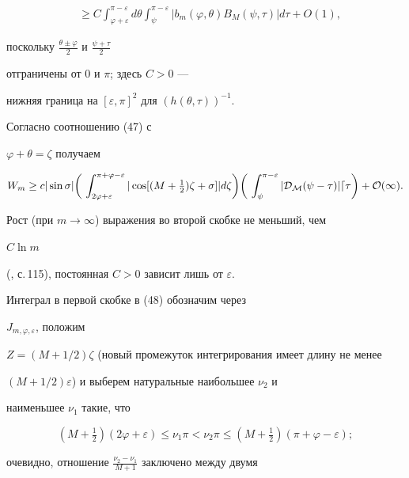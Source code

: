 \begin{pf}
\begin{align*}
%


&\ge C\int^{\pi-\varepsilon}_{\varphi+\varepsilon} 


d\theta\int^{\pi-\varepsilon}_\psi 


|b_m(\varphi,\theta)B_M(\psi,\tau)|d\tau+O(1), 


\end{align*} 


поскольку $\frac{\theta\pm\varphi}{2}$ и $\frac{\psi+\tau}{2}$ 


отграничены от $0$ и $\pi$; здесь $C>0$ --- 


нижняя граница на $[\varepsilon,\pi]^2$ для $(h(\theta,\tau))^{-1}$. 


Согласно соотношению (47) с 


$\varphi+\theta=\zeta$ получаем 


\begin{equation} 


W_m\ge c|\sin\sigma|\bigg(\, 


\int^{\pi+\varphi-\varepsilon}_{2\varphi+\varepsilon} 


|\cos[(M+\tfrac{1}{2})\zeta+\sigma]|d\zeta\bigg) 


\bigg(\,\int^{\pi-\varepsilon}_\psi


|\cal D_M(\psi-\tau)|d\tau\bigg)+O(1). 


\end{equation} 


Рост (при $m\to\infty$) выражения во второй скобке не меньший, чем 


$C\ln m$ 


(\cite{2}, с.\,115), постоянная $C>0$ зависит лишь от $\varepsilon$. 


Интеграл в первой скобке в (48) обозначим через 


$J_{m,\varphi,\varepsilon}$, положим 


$Z=(M+1/2)\zeta$ (новый промежуток интегрирования имеет длину не менее 


$(M+1/2)\varepsilon$) и выберем натуральные наибольшее $\nu_2$ и 


наименьшее $\nu_1$ такие, что 


$$ 


(M+\tfrac{1}{2})(2\varphi+\varepsilon)\le\nu_1\pi<\nu_2\pi\le 


(M+\tfrac{1}{2})(\pi+\varphi-\varepsilon); 


$$ 


очевидно, отношение $\frac{\nu_2-\nu_1}{M+1}$ заключено между двумя 



\end{pf}
